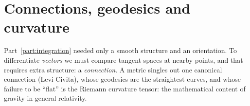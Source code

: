 \clearpage
\part{Connections, geodesics and curvature}\label{part:geometry}

Part~\ref{part:integration} needed only a smooth structure and an orientation. To differentiate \emph{vectors} we must compare tangent spaces at nearby points, and
that requires extra structure: a \emph{connection}. A metric singles out one canonical connection (Levi-Civita), whose geodesics are the straightest curves, and
whose failure to be ``flat'' is the Riemann curvature tensor: the mathematical content of gravity in general relativity.
